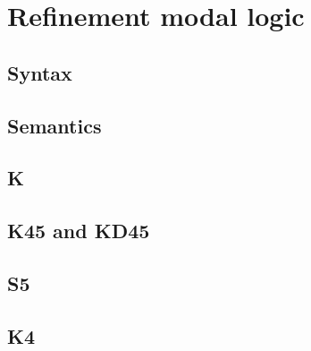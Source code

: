 \chapter{Refinement modal logic}\label{rml}

\section{Syntax}

\section{Semantics}

\section{K}

\section{K45 and KD45}

\section{S5}

\section{K4}
